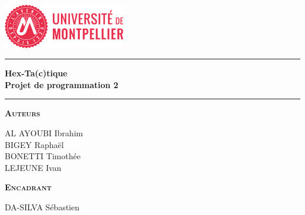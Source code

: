 \begin{titlepage}
\begin{center}
\vspace{2cm}
\includegraphics[width=0.4\textwidth]{root/UM1.png}~\\[1cm]
\vspace{2cm}

\hrule
\vspace{.5cm}
{\huge\bfseries{Hex-Ta(c)tique\\Projet de programmation 2}} %
\vspace{.5cm}

\hrule
\vspace{1.5cm}

\textsc{\textbf{Auteurs}}\\
\vspace{.5cm}
\centering

AL AYOUBI Ibrahim\\
BIGEY Raphaël\\
BONETTI Timothée\\
LEJEUNE Ivan\\


\vspace{1cm}

\textsc{\textbf{Encadrant}}\\
\vspace{.5cm}
\centering

DA-SILVA Sébastien

\vspace{4cm}

\centering {} %
\end{center}
\end{titlepage}